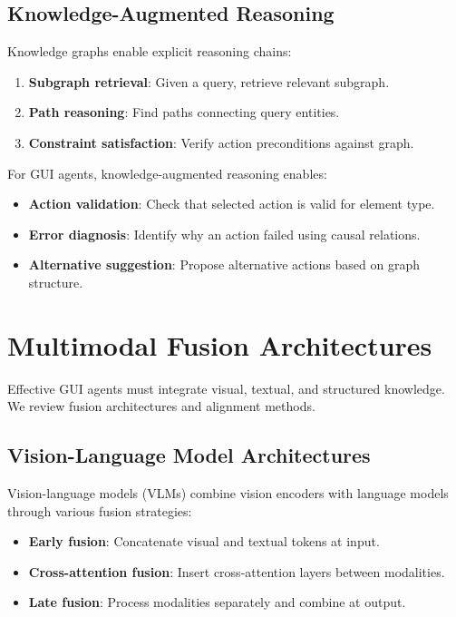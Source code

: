 \documentclass[11pt]{article}
\begin{document}
\subsection{Knowledge-Augmented Reasoning}

Knowledge graphs enable explicit reasoning chains:

\begin{enumerate}
    \item \textbf{Subgraph retrieval}: Given a query, retrieve relevant subgraph.
    \item \textbf{Path reasoning}: Find paths connecting query entities.
    \item \textbf{Constraint satisfaction}: Verify action preconditions against graph.
\end{enumerate}

For GUI agents, knowledge-augmented reasoning enables:

\begin{itemize}
    \item \textbf{Action validation}: Check that selected action is valid for element type.
    \item \textbf{Error diagnosis}: Identify why an action failed using causal relations.
    \item \textbf{Alternative suggestion}: Propose alternative actions based on graph structure.
\end{itemize}

\section{Multimodal Fusion Architectures}
\label{sec:fusion}

Effective GUI agents must integrate visual, textual, and structured knowledge. We review fusion architectures and alignment methods.

\subsection{Vision-Language Model Architectures}

Vision-language models (VLMs) combine vision encoders with language models through various fusion strategies:

\begin{itemize}
    \item \textbf{Early fusion}: Concatenate visual and textual tokens at input.
    \item \textbf{Cross-attention fusion}: Insert cross-attention layers between modalities.
    \item \textbf{Late fusion}: Process modalities separately and combine at output.
\end{itemize}
\end{document}
